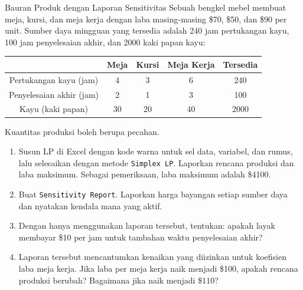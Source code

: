 \begin{ex}{Bauran Produk dengan Laporan Sensitivitas}{}
\label{ex:excel-furniture-sensitivity}
 Sebuah bengkel mebel membuat meja, kursi, dan meja kerja dengan laba masing-masing \$70, \$50, dan \$90 per unit. Sumber daya mingguan yang tersedia adalah 240 jam pertukangan kayu, 100 jam penyelesaian akhir, dan 2000 kaki papan kayu:

\begin{center}
\begin{tabular}{c|c|c|c|c}
 & \textbf{Meja} & \textbf{Kursi} & \textbf{Meja Kerja} & \textbf{Tersedia} \\
\hline
Pertukangan kayu (jam) & 4 & 3 & 6 & 240 \\
Penyelesaian akhir (jam) & 2 & 1 & 3 & 100 \\
Kayu (kaki papan) & 30 & 20 & 40 & 2000 \\
\end{tabular}
\par{}\label{tab:software-excel-tab04}%

\end{center}

Kuantitas produksi boleh berupa pecahan.
\begin{enumerate}
\item Susun LP di Excel dengan kode warna untuk sel data, variabel, dan rumus, lalu selesaikan dengan metode \texttt{Simplex LP}. Laporkan rencana produksi dan laba maksimum. Sebagai pemeriksaan, laba maksimum adalah \$4100.
\item Buat \texttt{Sensitivity Report}. Laporkan harga bayangan setiap sumber daya dan nyatakan kendala mana yang aktif.
\item Dengan hanya menggunakan laporan tersebut, tentukan: apakah layak membayar \$10 per jam untuk tambahan waktu penyelesaian akhir?
\item Laporan tersebut mencantumkan kenaikan yang diizinkan untuk koefisien laba meja kerja. Jika laba per meja kerja naik menjadi \$100, apakah rencana produksi berubah? Bagaimana jika naik menjadi \$110?
\end{enumerate}
\exrefs{\S\ref{sec:excel-solver}}
\end{ex}

